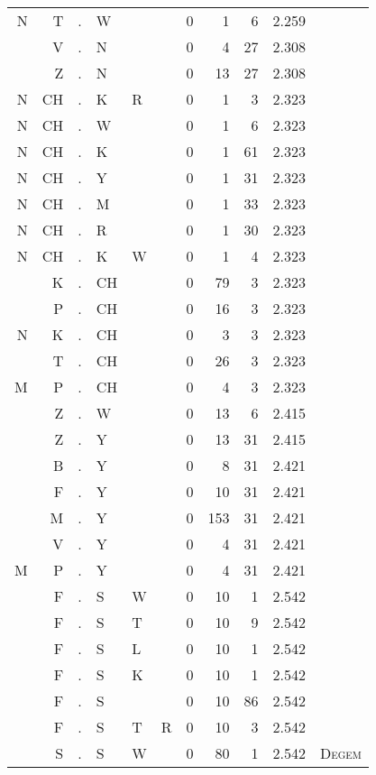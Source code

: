 \begin{longtable}{r@{ } r@{ } c@{ } l@{ } l@{ } l@{ } r r r r l }
N & T & . & W &   &   & 0 & 1 & 6 & 2.259 &  \\
  & V & . & N &   &   & 0 & 4 & 27 & 2.308 &  \\
  & Z & . & N &   &   & 0 & 13 & 27 & 2.308 &  \\
N & CH & . & K & R &   & 0 & 1 & 3 & 2.323 &  \\
N & CH & . & W &   &   & 0 & 1 & 6 & 2.323 &  \\
N & CH & . & K &   &   & 0 & 1 & 61 & 2.323 &  \\
N & CH & . & Y &   &   & 0 & 1 & 31 & 2.323 &  \\
N & CH & . & M &   &   & 0 & 1 & 33 & 2.323 &  \\
N & CH & . & R &   &   & 0 & 1 & 30 & 2.323 &  \\
N & CH & . & K & W &   & 0 & 1 & 4 & 2.323 &  \\
  & K & . & CH &   &   & 0 & 79 & 3 & 2.323 &  \\
  & P & . & CH &   &   & 0 & 16 & 3 & 2.323 &  \\
N & K & . & CH &   &   & 0 & 3 & 3 & 2.323 &  \\
  & T & . & CH &   &   & 0 & 26 & 3 & 2.323 &  \\
M & P & . & CH &   &   & 0 & 4 & 3 & 2.323 &  \\
  & Z & . & W &   &   & 0 & 13 & 6 & 2.415 &  \\
  & Z & . & Y &   &   & 0 & 13 & 31 & 2.415 &  \\
  & B & . & Y &   &   & 0 & 8 & 31 & 2.421 &  \\
  & F & . & Y &   &   & 0 & 10 & 31 & 2.421 &  \\
  & M & . & Y &   &   & 0 & 153 & 31 & 2.421 &  \\
  & V & . & Y &   &   & 0 & 4 & 31 & 2.421 &  \\
M & P & . & Y &   &   & 0 & 4 & 31 & 2.421 &  \\
  & F & . & S & W &   & 0 & 10 & 1 & 2.542 &  \\
  & F & . & S & T &   & 0 & 10 & 9 & 2.542 &  \\
  & F & . & S & L &   & 0 & 10 & 1 & 2.542 &  \\
  & F & . & S & K &   & 0 & 10 & 1 & 2.542 &  \\
  & F & . & S &   &   & 0 & 10 & 86 & 2.542 &  \\
  & F & . & S & T & R & 0 & 10 & 3 & 2.542 &  \\
  & S & . & S & W &   & 0 & 80 & 1 & 2.542 & \textsc{Degem} \\

\end{longtable}
